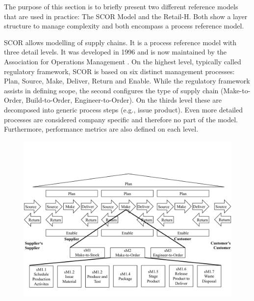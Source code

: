 		The purpose of this section is to briefly present two different reference models that are used in practice: The \acrfull{SCOR} Model and the Retail-H. Both show a layer structure to manage complexity and both encompass a process reference model. 
		
		\acrshort{SCOR} allows modelling of supply chains. It is a process reference model with three detail levels. It was developed in 1996 and is now maintained by the Association for Operations Management \cite{APICS2015}. On the highest level, typically called regulatory framework, \acrshort{SCOR}  is based on six distinct management processes: Plan, Source, Make, Deliver, Return and Enable. While the regulatory framework assists in defining scope, the second configures the type of supply chain (Make-to-Order, Build-to-Order, Engineer-to-Order). On the thirds level these are decomposed into generic process steps (e.g., issue product). Even more detailed processes are considered company specific and therefore no part of the model. Furthermore, performance metrics are also defined on each level. 

		\begin{figure}[caption={SCOR Model}, label={fig:scor}]
		{	\includegraphics[width=.8\textwidth]{figures/scor.pdf}}
		\end{figure}
	


